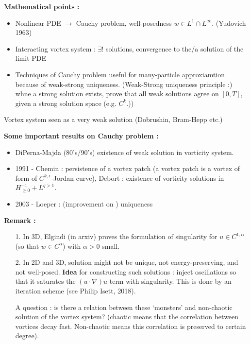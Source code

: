 \documentclass[12pt,a4paper]{extarticle}
\begin{document}
\textbf{Mathematical points :}
\begin{itemize}
\item Nonlinear PDE $\rightarrow$ Cauchy problem, well-posedness $w\in L^1 \cap L^{\infty}$. (Yudovich 1963)
\item Interacting vortex system : $\exists !$ solutions, convergence to the/a solution of the limit PDE
\item Techniques of Cauchy problem useful for many-particle approxiamtion because of weak-strong uniqueness. (Weak-Strong uniqueness principle :) whne a strong solution exists, prove that all weak solutions agree on $[0, T]$, given a strong solution space (e.g. $C^k$.))
\end{itemize}
Vortex system seen as a very weak solution (Dobrushin, Bram-Hepp etc.)
\s

\textbf{Some important results on Cauchy problem :}
\begin{itemize}
\item DiPerna-Majda (80's/90's) existence of weak solution in vorticity system.
\item 1991 - Chemin : persistence of a vortex patch (a vortex patch is a vortex of form of $C^{k, \epsilon}$-Jordan curve), Debort : existence of vorticity solutions in $H^{-1}_{\geq 0} + L^{q>1}$.
\item 2003 - Loeper : (improvement on ) uniqueness 
\end{itemize}
\s

\textbf{Remark :}
\begin{itemize}
\item[1.] In 3D, Elgindi (in arxiv) proves the formulation of singularity for $u\in C^{1, \alpha}$ (so that $w\in C^{\alpha}$) with $\alpha >0$ small. 
\item[2.] In 2D and 3D, solution might not be unique, not energy-preserving, and not well-posed. \textbf{Idea} for constructing such solutions : inject oscillations so that it saturates the $(u\cdot \nabla)u$ term with singularity. This is done by an iteration scheme (see Philip Isett, 2018).

\quad A question : is there a relation between these `monsters' and non-chaotic solution of the vortex system? (chaotic means that the correlation between vortices decay fast. Non-chaotic means this correlation is preserved to certain degree).
\end{itemize}
\s
\end{document}
